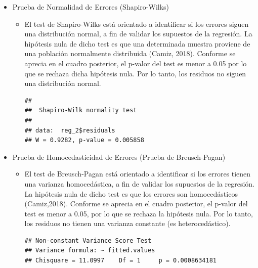 \documentclass[a4paper,10pt]{article}\usepackage[]{graphicx}\usepackage[]{color}
\makeatletter
\newenvironment{kframe}{%
 \def\at@end@of@kframe{}%
 \ifinner\ifhmode%
  \def\at@end@of@kframe{\end{minipage}}%
  \begin{minipage}{\columnwidth}%
 \fi\fi%
 \def\FrameCommand##1{\hskip\@totalleftmargin \hskip-\fboxsep
 \colorbox{shadecolor}{##1}\hskip-\fboxsep
     \hskip-\linewidth \hskip-\@totalleftmargin \hskip\columnwidth}%
 \MakeFramed {\advance\hsize-\width
   \@totalleftmargin\z@ \linewidth\hsize
   \@setminipage}}%
 {\par\unskip\endMakeFramed%
 \at@end@of@kframe}
\newenvironment{knitrout}{}{} %
\makeatother
\begin{document}
\begin{itemize}
  \item Prueba de Normalidad de Errores (Shapiro-Wilks)
    \begin{itemize}
      \item El test de Shapiro-Wilks está orientado a identificar si los errores siguen una distribución normal, a fin de validar los supuestos de la regresión. La hipótesis nula de dicho test es que una determinada muestra proviene de una población normalmente distribuida (Camiz, 2018). Conforme se aprecia en el cuadro posterior, el p-valor del test es menor a 0.05 por lo que se rechaza dicha hipótesis nula. Por lo tanto, los residuos no siguen una distribución normal.
\begin{knitrout}
\color{fgcolor}\begin{kframe}
\begin{verbatim}
## 
## 	Shapiro-Wilk normality test
## 
## data:  reg_2$residuals
## W = 0.9282, p-value = 0.005858
\end{verbatim}
\end{kframe}
\end{knitrout}
    \end{itemize}  
  \item Prueba de Homocedasticidad de Errores (Prueba de Breusch-Pagan)
    \begin{itemize}
      \item El test de Breusch-Pagan está orientado a identificar si los errores tienen una varianza homocedástica, a fin de validar los supuestos de la regresión. La hipótesis nula de dicho test es que los errores son homocedásticos (Camiz,2018). Conforme se aprecia en el cuadro posterior, el p-valor del test es menor a 0.05, por lo que se rechaza la hipótesis nula. Por lo tanto, los residuos no tienen una varianza constante (es heterocedástico).
\begin{knitrout}
\color{fgcolor}\begin{kframe}
\begin{verbatim}
## Non-constant Variance Score Test 
## Variance formula: ~ fitted.values 
## Chisquare = 11.0997    Df = 1     p = 0.0008634181
\end{verbatim}
\end{kframe}
\end{knitrout}
    \end{itemize}
\end{itemize}
\end{document}
